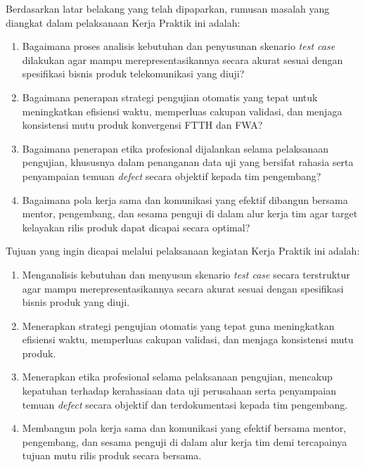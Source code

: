 \documentclass[12pt,a4paper]{article}
\begin{document}
\vspace{0.4cm}
Berdasarkan latar belakang yang telah dipaparkan, rumusan masalah yang diangkat dalam pelaksanaan Kerja Praktik ini adalah:
\begin{enumerate}[label=\arabic*.,leftmargin=1.5em,itemsep=2pt,topsep=2pt]
    \item Bagaimana proses analisis kebutuhan dan penyusunan skenario \textit{test case} dilakukan agar mampu merepresentasikannya secara akurat sesuai dengan spesifikasi bisnis produk telekomunikasi yang diuji?
    \item Bagaimana penerapan strategi pengujian otomatis yang tepat untuk meningkatkan efisiensi waktu, memperluas cakupan validasi, dan menjaga konsistensi mutu produk konvergensi FTTH dan FWA?
    \item Bagaimana penerapan etika profesional dijalankan selama pelaksanaan pengujian, khususnya dalam penanganan data uji yang bersifat rahasia serta penyampaian temuan \textit{defect} secara objektif kepada tim pengembang?
    \item Bagaimana pola kerja sama dan komunikasi yang efektif dibangun bersama mentor, pengembang, dan sesama penguji di dalam alur kerja tim agar target kelayakan rilis produk dapat dicapai secara optimal?
\end{enumerate}

\vspace{0.4cm}
Tujuan yang ingin dicapai melalui pelaksanaan kegiatan Kerja Praktik ini adalah:
\begin{enumerate}[label=\arabic*.,leftmargin=1.5em,itemsep=2pt,topsep=2pt]
    \item Menganalisis kebutuhan dan menyusun skenario \textit{test case} secara terstruktur agar mampu merepresentasikannya secara akurat sesuai dengan spesifikasi bisnis produk yang diuji.
    \item Menerapkan strategi pengujian otomatis yang tepat guna meningkatkan efisiensi waktu, memperluas cakupan validasi, dan menjaga konsistensi mutu produk.
    \item Menerapkan etika profesional selama pelaksanaan pengujian, mencakup kepatuhan terhadap kerahasiaan data uji perusahaan serta penyampaian temuan \textit{defect} secara objektif dan terdokumentasi kepada tim pengembang.
    \item Membangun pola kerja sama dan komunikasi yang efektif bersama mentor, pengembang, dan sesama penguji di dalam alur kerja tim demi tercapainya tujuan mutu rilis produk secara bersama.
\end{enumerate}
\end{document}
